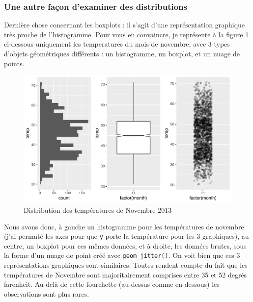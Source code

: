 \documentclass[a4paperpaper,]{article}
\theoremstyle{definition}
\theoremstyle{definition}
\theoremstyle{definition}
\theoremstyle{remark}
\begin{document}
\subsubsection{Une autre façon d'examiner des
distributions}\label{une-autre-facon-dexaminer-des-distributions}

Dernière chose concernant les boxplots : il s'agit d'une représentation
graphique très proche de l'histogramme. Pour vous en convaincre, je
représente à la figure \ref{fig:compboxplot} ci-dessous uniquement les
temperatures du mois de novembre, avec 3 types d'objets géométriques
différents : un histogramme, un boxplot, et un nuage de points.

\begin{figure}[htpb]

{\centering \includegraphics[width=0.9\linewidth]{figure/compboxplot-1} 

}

\caption{Distribution des températures de Novembre 2013}\label{fig:compboxplot}
\end{figure}

Nous avons donc, à gauche un histogramme pour les températures de
novembre (j'ai permuté les axes pour que \texttt{y} porte la température
pour les 3 graphiques), au centre, un boxplot pour ces mêmes données, et
à droite, les données brutes, sous la forme d'un nuage de point créé
avec \texttt{geom\_jitter()}. On voit bien que ces 3 représentations
graphiques sont similaires. Toutes rendent compte du fait que les
températures de Novembre sont majoritairement comprises entre 35 et 52
degrés farenheit. Au-delà de cette fourchette (au-dessus comme
en-dessous) les observations sont plus rares.
\end{document}

